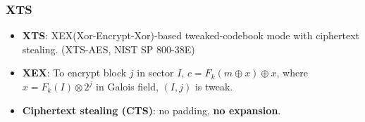 \begin{frame}\frametitle{XTS}
\begin{itemize}
\item \textbf{XTS}: XEX(Xor-Encrypt-Xor)-based tweaked-codebook mode with ciphertext stealing. (XTS-AES, NIST SP 800-38E)
\item \textbf{XEX}: To encrypt block $j$ in sector $I$, $c = F_k(m\oplus x)\oplus x$, where $x=F_k(I)\otimes 2^j$ in Galois field, $(I,j)$ is tweak.
\item \textbf{Ciphertext stealing (CTS)}: no padding, \textbf{no expansion}.
\end{itemize}
\begin{figure}
\begin{center}

\end{center}
\end{figure}
\end{frame}
